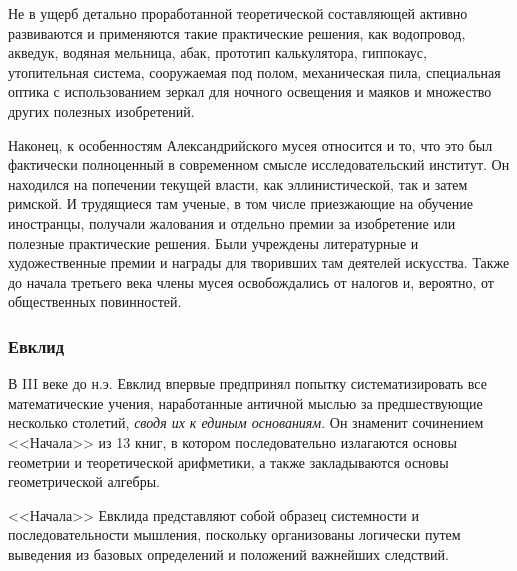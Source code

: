 Не в ущерб детально проработанной теоретической составляющей активно развиваются и применяются такие практические решения, как водопровод, акведук, водяная мельница, абак, прототип калькулятора, гиппокаус, утопительная система, сооружаемая под полом, механическая пила, специальная оптика с использованием зеркал для ночного освещения и маяков и множество других полезных изобретений.

Наконец, к особенностям Александрийского мусея относится и то, что это был фактически полноценный в современном смысле исследовательский институт. Он находился на попечении текущей власти, как эллинистической, так и затем римской. И трудящиеся там ученые, в том числе приезжающие на обучение иностранцы, получали жалования и отдельно премии за изобретение или полезные практические решения. Были учреждены литературные и художественные премии и награды для творивших там деятелей искусства. Также до начала третьего века члены мусея освобождались от налогов и, вероятно, от общественных повинностей. 

\subsubsection{Евклид}
В III веке до н.э. Евклид впервые предпринял попытку систематизировать все математические учения, наработанные античной мыслью за предшествующие несколько столетий, \textit{сводя их к единым основаниям}.
Он знаменит сочинением <<Начала>> из 13 книг, в котором последовательно излагаются основы геометрии и теоретической арифметики, а также закладываются основы геометрической алгебры. 


<<Начала>> Евклида представляют собой образец системности и последовательности мышления, поскольку организованы логически путем выведения из базовых определений и положений важнейших следствий. 

